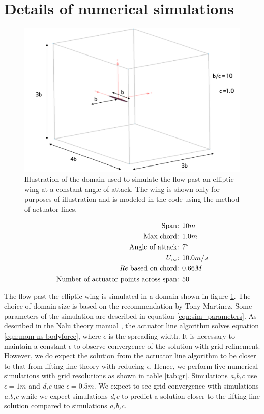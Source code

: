 \documentclass{jfm}
\begin{document}
\section{Details of numerical simulations}


\begin{figure}
  \centerline{\includegraphics[width=\textwidth]{images/domain_illustration}}%
  \caption{Illustration of the domain used to simulate the flow past
    an elliptic wing at a constant angle of attack. The wing is shown
    only for purposes of illustration and is modeled in the code using
  the method of actuator lines.}
\label{fig:domain_illustration}
\end{figure}

\begin{eqnarray}  
  \textrm{Span: } & 10m \nonumber \\
  \textrm{Max chord: } & 1.0m \nonumber \\
  \textrm{Angle of attack: } & 7^{\circ} \nonumber \\
  U_{\infty} \textrm{: } & 10.0m/s \label{eqn:sim_parameters} \\
  \mbox{\textit{Re}} \textrm{ based on chord: } & 0.66M \nonumber \\
  \textrm{Number of actuator points across span: } & 50 \nonumber
\end{eqnarray}


The flow past the elliptic wing is simulated in a domain shown in
figure \ref{fig:domain_illustration}. The choice of domain size is based on
the recommendation by Tony Martinez. Some parameters of the simulation
are described in equation \ref{eqn:sim_parameters}. As described in the
Nalu theory manual \citep{naluDoc}, the actuator line algorithm solves
equation \ref{eqn:mom-ns-bodyforce}, where $\epsilon$ is the spreading
width. It is necessary to maintain a constant $\epsilon$ to observe
convergence of the solution with grid refinement. However, we do
expect the solution from the actuator line algorithm to be closer to
that from lifting line theory with reducing $\epsilon$. Hence,
we perform five numerical simulations with grid resolutions as shown
in table \ref{tab:gr}. Simulations \textit{a,b,c} use $\epsilon=1m$ and
\textit{d,e} use $\epsilon=0.5m$. We expect to see grid convergence
with simulations \textit{a,b,c} while we expect simulations
\textit{d,e} to predict a solution closer to the lifting line solution
compared to simulations \textit{a,b,c}.
\end{document}
